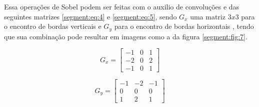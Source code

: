 Essa operações de Sobel podem ser feitas com o auxilio de convoluções e das seguintes matrizes \ref{segment:eq:4} e \ref{segment:eq:5}, sendo $G_x$ uma matriz $3x3$ para o encontro de bordas verticais e $G_y$ para o encontro de bordas horizontais \cite{pedrini2008analise}, tendo que sua combinação pode resultar em imagens como a da figura \ref{segment:fig:7}.

\begin{equation}
\label{segment:eq:4}
    G_x = \begin{bmatrix}
    -1 & 0 & 1 \\ 
    -2 & 0 & 2 \\ 
    -1 & 0 & 1
    \end{bmatrix}
\end{equation}

\begin{equation}
\label{segment:eq:5}
    G_y = \begin{bmatrix}
    -1 & -2 & -1 \\ 
     0 & 0 & 0 \\ 
     1 & 2 & 1
    \end{bmatrix}
\end{equation}

